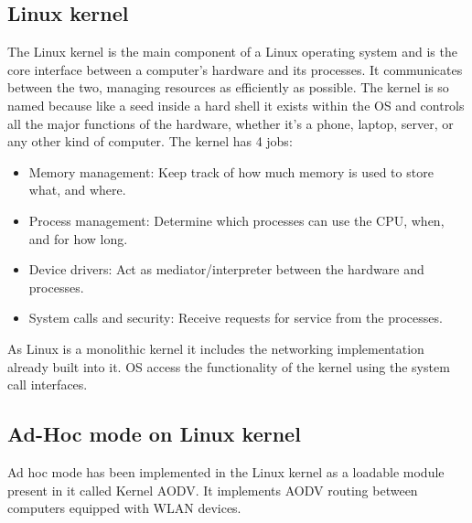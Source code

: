 \vspace{12pt}

\subsection{Linux kernel}
\vspace{12pt}
The Linux kernel is the main component of a Linux operating system and is the core interface between a computer’s hardware and its processes. It communicates between the two, managing resources as efficiently as possible.
\vspace{12pt}
The kernel is so named because like a seed inside a hard shell it exists within the OS and controls all the major functions of the hardware, whether it’s a phone, laptop, server, or any other kind of computer.
\vspace{12pt}
The kernel has 4 jobs:
\vspace{12pt}
\begin{itemize}
	\item Memory management: Keep track of how much memory is used to store what, and where.
	\item Process management: Determine which processes can use the CPU, when, and for how long.
	\item Device drivers: Act as mediator/interpreter between the hardware and processes.
	\item System calls and security: Receive requests for service from the processes.
\end{itemize}
\vspace{12pt}
As Linux is a monolithic kernel it includes the networking implementation already built into it. OS access the functionality of the kernel using the system call interfaces. 
\vspace{12pt}

\subsection{Ad-Hoc mode on Linux kernel}
\vspace{12pt}
Ad hoc mode has been implemented in the Linux kernel as a loadable module present in it called Kernel AODV. It implements AODV routing between computers equipped with WLAN devices.\cite{The_AODVM}
\vspace{12pt}

